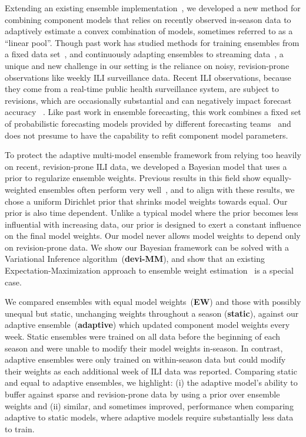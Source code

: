 \documentclass[12pt]{article}
\begin{document}
Extending an existing ensemble implementation~\cite{reich2019collaborative}, we developed a new method for combining component models that relies on recently observed in-season data to adaptively estimate a convex combination of models, sometimes referred to as a ``linear pool''.
Though past work has studied methods for training ensembles from a fixed data set~\cite{gneiting2005weather,foley2012current,van2007super}, and continuously adapting ensembles to streaming data~\cite{pari2018multi,fern2003online,benkeser2018online},
a unique and new challenge in our setting is the reliance on noisy, revision-prone observations like weekly ILI surveillance data.
Recent ILI observations, because they come from a real-time public health surveillance system, are subject to revisions, which are occasionally substantial and can negatively impact forecast accuracy ~\cite{osthus2019even,reich2019collaborativepnas}.
Like past work in ensemble forecasting, this work combines a fixed set of probabilistic forecasting models provided by different forecasting teams~\cite{reich2019collaborativepnas} and does not presume to have the capability to refit  component model parameters.

To protect the adaptive multi-model ensemble framework from relying too heavily on recent, revision-prone ILI data, we developed a Bayesian model that uses a prior to regularize ensemble weights.
Previous results in this field show equally-weighted ensembles often perform very well~\cite{mcgowan2019collaborative,reich2019collaborative}, and to align with these results, we chose a uniform Dirichlet prior that shrinks model weights towards equal.
Our prior is also time dependent. 
Unlike a typical model where the prior becomes less influential with increasing data, our prior is designed to exert a constant influence on the final model weights. 
Our model never allows model weights to depend only on revision-prone data.
We show our Bayesian framework can be solved with a Variational Inference algorithm~(\textbf{devi-MM}), and show that an existing Expectation-Maximization approach to ensemble weight estimation~\cite{reich2019collaborative} is a special case.


We compared ensembles with equal model weights~(\textbf{EW}) and those with possibly unequal but static, unchanging weights throughout a season (\textbf{static}),  against our adaptive ensemble~(\textbf{adaptive}) which updated component model weights every week.
Static ensembles were trained on all data before the beginning of each season and were unable to modify their model weights in-season.
In contrast, adaptive ensembles were only trained on within-season data but could modify their weights as each additional week of ILI data was reported.
Comparing static and equal to adaptive ensembles, we highlight: (i) the adaptive model's ability to buffer against sparse and revision-prone data by using a prior over ensemble weights and (ii) similar, and sometimes improved, performance when comparing adaptive to static models, where adaptive models require substantially less data to train.
\end{document}
